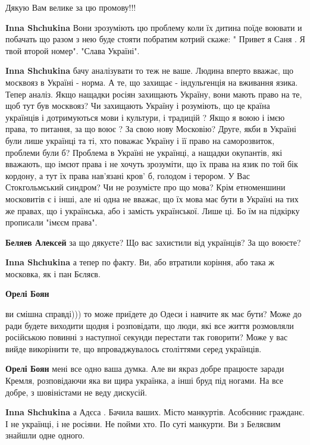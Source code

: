 \begin{itemize}
\begin{itemize}
Дякую Вам велике за цю промову!!!

\textbf{Inna Shchukina} Вони зрозуміють цю проблему коли їх дитина поїде воювати и побачать що разом з нею буде стояти побратим котрий скаже: " Привет я Саня . Я твой второй номер". "Слава Україні".

\textbf{Inna Shchukina} бачу аналізувати то теж не ваше. Людина вперто вважає, що москвояз в Україні - норма. А те, що захищає - індульгенція на вживання язика.
Тепер аналіз.
Якщо нащадки росіян захищають Україну, вони мають право на те, щоб тут був москвояз?
Чи захищають Україну і розуміють, що це країна українців і дотримуються мови і культури, і традицій ?
Якщо я воюю і імєю права, то питання, за що воює ? За свою нову Московію?
Друге, якби в Україні були лише українці та ті, хто поважає Україну і її право на саморозвиток, проблеми були б?
Проблема в Україні не українці, а нащадки окупантів, які вважають, що імєют права і не хочуть зрозуміти, що їх права на язик по той бік кордону, а тут їх права нав'язані кров' б, голодом і терором.
У Вас Стокгольмський синдром?
Чи не розумієте про що мова?
Крім етноменшини
московитів є і інші, але ні одна не вважає, що їх мова має бути в Україні на тих же правах, що і українська, або і замість української. Лише ці. Бо їм на підкірку прописали "імєєм права".

\textbf{Беляев Алексей} за що дякуєте? Що вас захистили від українців? За що воюєте?

\textbf{Inna Shchukina} а тепер по факту. Ви, або втратили коріння, або така ж московка, як і пан Бєляєв.

\textbf{Орелі Боян} 

ви смішна справді))) то може приїдете до Одеси і навчите як має бути? Може до
ради будете виходити щодня і розповідати, що люди, які все життя розмовляли
російською повинні з наступної секунди перестати так говорити? Може у вас вийде
викорінити те, що впроваджувалось століттями серед українців.

\textbf{Орелі Боян} мені все одно ваша думка. Але ви якраз добре працюєте заради Кремля, розповідаючи яка ви щира українка, а інші бруд під ногами. На все добре, з шовіністами не веду дискусій.

\textbf{Inna Shchukina} а Адєса . Бачила ваших. Місто манкуртів. Асобєнниє гражданє. І не українці, і не росіяни. Не пойми хто. По суті манкурти. Ви з Беляєвим знайшли одне одного.


\end{itemize}
\end{itemize}
